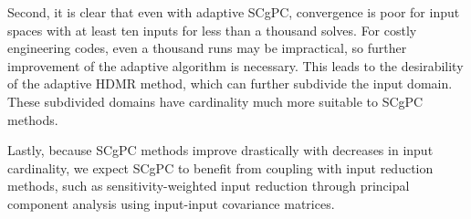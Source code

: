 Second, it is clear that even with adaptive SCgPC, convergence is poor for input spaces with at least ten
inputs for less than a thousand solves.  For costly engineering codes, even a thousand runs may be
impractical, so further improvement of the adaptive algorithm is necessary.  This leads to the desirability of
the adaptive HDMR method, which can further subdivide the input domain.  These subdivided domains have
cardinality much more suitable to SCgPC methods.

Lastly, because SCgPC methods improve drastically with decreases in input cardinality, we expect SCgPC to
benefit from coupling with input reduction methods, such as sensitivity-weighted input reduction through
principal component analysis using input-input covariance matrices.
